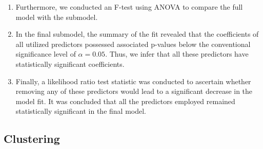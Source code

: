 \documentclass[conference]{IEEEtran}
\begin{document}
\begin{enumerate}
    \item Furthermore, we conducted an F-test using ANOVA to compare the full model with the submodel.
    
    \item In the final submodel, the summary of the fit revealed that the coefficients of all utilized predictors possessed associated p-values below the conventional significance level of \(\alpha = 0.05\). Thus, we infer that all these predictors have statistically significant coefficients.

    \item Finally, a likelihood ratio test statistic was conducted to ascertain whether removing any of these predictors would lead to a significant decrease in the model fit. It was concluded that all the predictors employed remained statistically significant in the final model.
    
\end{enumerate}

\subsection{Clustering}
\end{document}
